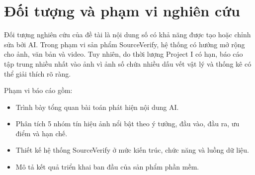 \section{Đối tượng và phạm vi nghiên cứu}
Đối tượng nghiên cứu của đề tài là nội dung số có khả năng được tạo hoặc chỉnh sửa bởi AI. Trong phạm vi sản phẩm SourceVerify, hệ thống có hướng mở rộng cho ảnh, văn bản và video. Tuy nhiên, do thời lượng Project I có hạn, báo cáo tập trung nhiều nhất vào ảnh vì ảnh số chứa nhiều dấu vết vật lý và thống kê có thể giải thích rõ ràng.

Phạm vi báo cáo gồm:
\begin{itemize}
  \item Trình bày tổng quan bài toán phát hiện nội dung AI.
  \item Phân tích 5 nhóm tín hiệu ảnh nổi bật theo ý tưởng, đầu vào, đầu ra, ưu điểm và hạn chế.
  \item Thiết kế hệ thống SourceVerify ở mức kiến trúc, chức năng và luồng dữ liệu.
  \item Mô tả kết quả triển khai ban đầu của sản phẩm phần mềm.
\end{itemize}
